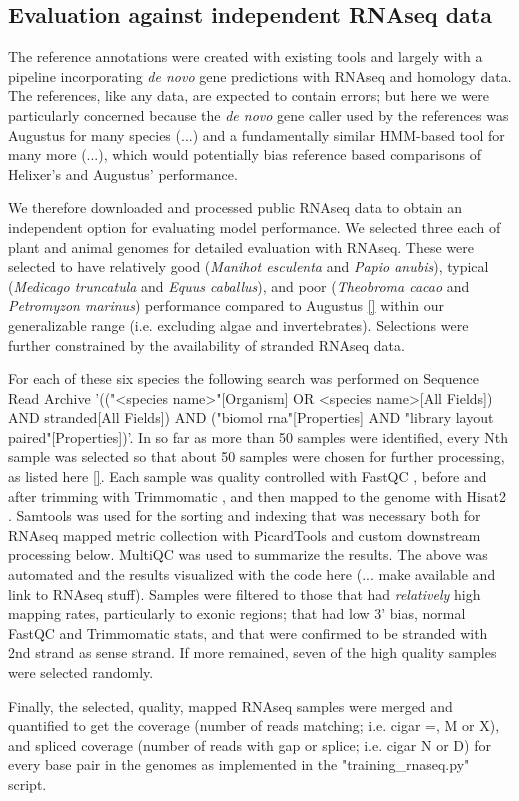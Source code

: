 \documentclass{bioinfo}
\begin{document}
\begin{methods}
\subsection{Evaluation against independent RNAseq data}
\label{sec:rnaseq}
The reference annotations were created with existing tools and largely with a pipeline incorporating
{\it de novo} gene predictions with RNAseq and homology data. The references, like any
data, are expected to contain errors; but here we were particularly concerned because
the {\it de novo} gene caller used by the references was Augustus for many species (...)
and a fundamentally similar HMM-based tool for many more (...), which would potentially bias 
reference based comparisons of Helixer's and Augustus' performance. 

We therefore downloaded and processed public RNAseq data to obtain an independent option 
for evaluating model performance. We selected three each of plant and animal genomes for
detailed evaluation with RNAseq. These were selected to have relatively good 
({\it Manihot esculenta} and {\it Papio anubis}), 
typical ({\it Medicago truncatula} and {\it Equus caballus}), 
and poor ({\it Theobroma cacao} and {\it Petromyzon marinus})
performance compared to Augustus \ref{} %
within our generalizable range (i.e. excluding algae and
invertebrates). Selections were further constrained by the availability of stranded RNAseq
data. 

For each of these six species the following search was performed on Sequence Read Archive
'(("<species name>"[Organism] OR <species name>[All Fields]) AND stranded[All Fields]) 
AND ("biomol rna"[Properties] AND "library layout paired"[Properties])'. In so far as 
more than 50 samples were identified, every Nth sample was selected so that about 50
samples were chosen for further processing, as listed here \ref{}. %
Each sample was quality controlled with FastQC \citep{}, before and after trimming
with Trimmomatic \citep{}, and then mapped to the genome with Hisat2 \citep{}. 
Samtools \citep{} was used for the sorting and indexing that was necessary both for
RNAseq mapped metric collection with PicardTools \citep{} and custom downstream 
processing below. MultiQC \citep{} was used to summarize the results. The above was 
automated and the results visualized with the code here (... make available and link to RNAseq stuff).
Samples were filtered to those that had {\it relatively} high mapping rates, particularly to
exonic regions; that had low 3' bias, normal FastQC and Trimmomatic stats, and that
were confirmed to be stranded with 2nd strand as sense strand. If more remained, seven
of the high quality samples were selected randomly.

Finally, the selected, quality, mapped RNAseq samples were merged and quantified to
get the coverage (number of reads matching; i.e. cigar =, M or X),
and spliced coverage (number of reads with gap or splice; i.e. cigar N or D)
for every base pair in the genomes as implemented in the "training\_rnaseq.py"
script.

\end{methods}
\end{document}
